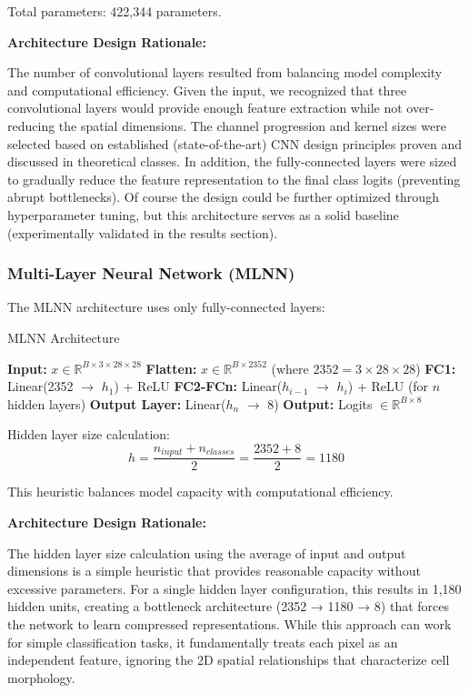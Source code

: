 \documentclass[runningheads]{llncs}
\begin{document}
Total parameters: 422,344 parameters.

\textbf{Architecture Design Rationale:}

The number of convolutional layers resulted from balancing model complexity and computational efficiency.
Given the input, we recognized that three convolutional layers would provide enough feature extraction
while not over-reducing the spatial dimensions.
The channel progression and kernel sizes were selected based on established (state-of-the-art) CNN design principles proven and discussed in theoretical classes.
In addition, the fully-connected layers were sized to gradually reduce the feature representation to the final class logits
(preventing abrupt bottlenecks).
Of course the design could be further optimized through hyperparameter tuning, but this architecture serves as a solid baseline
(experimentally validated in the results section).


\subsubsection{Multi-Layer Neural Network (MLNN)}

The MLNN architecture uses only fully-connected layers:

\begin{algorithm}
\caption{MLNN Architecture}
\begin{algorithmic}[1]
\STATE \textbf{Input:} $x \in \mathbb{R}^{B \times 3 \times 28 \times 28}$
\STATE \textbf{Flatten:} $x \in \mathbb{R}^{B \times 2352}$ (where $2352 = 3 \times 28 \times 28$)
\STATE \textbf{FC1:} Linear(2352 $\rightarrow$ $h_1$) + ReLU
\STATE \textbf{FC2-FCn:} Linear($h_{i-1}$ $\rightarrow$ $h_i$) + ReLU (for $n$ hidden layers)
\STATE \textbf{Output Layer:} Linear($h_n$ $\rightarrow$ 8)
\STATE \textbf{Output:} Logits $\in \mathbb{R}^{B \times 8}$
\end{algorithmic}
\end{algorithm}

Hidden layer size calculation:
\begin{equation}
h = \frac{n_{input} + n_{classes}}{2} = \frac{2352 + 8}{2} = 1180
\end{equation}

This heuristic balances model capacity with computational efficiency.

\textbf{Architecture Design Rationale:}

The hidden layer size calculation using the average of input and output dimensions is a simple heuristic
that provides reasonable capacity without excessive parameters. For a single hidden layer configuration,
this results in 1,180 hidden units, creating a bottleneck architecture (2352 → 1180 → 8) that forces
the network to learn compressed representations. While this approach can work for simple classification tasks,
it fundamentally treats each pixel as an independent feature, ignoring the 2D spatial relationships that
characterize cell morphology.
\end{document}
